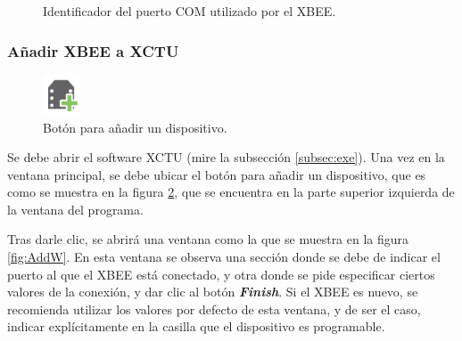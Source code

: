 \begin{figure}[H] %
\caption{Identificador del puerto COM utilizado por el XBEE.}
\label{fig:IdCom}
\end{figure}

\subsubsection{Añadir XBEE a XCTU}

\begin{figure} %
    \centering
    \includegraphics[width=0.10\textwidth]{Figures/XCTU/AddDeviceButton}
    \caption{Botón para añadir un dispositivo.}
    \label{fig:AddDevice}
\end{figure}

Se debe abrir el software XCTU (mire la subsección \ref{subsec:exe}). Una vez en la ventana principal, se debe ubicar el botón para añadir un dispositivo, que es como se muestra en la figura \ref{fig:AddDevice}, que se encuentra en la parte superior izquierda de la ventana del programa.

Tras darle clic, se abrirá una ventana como la que se muestra en la figura \ref{fig:AddW}. En esta ventana se observa una sección donde se debe de indicar el puerto al que el XBEE está conectado, y otra donde se pide especificar ciertos valores de la conexión, y dar clic al botón \textit{\textbf{Finish}}. Si el XBEE es nuevo, se recomienda utilizar los valores por defecto de esta ventana, y de ser el caso, indicar explícitamente en la casilla que el dispositivo es programable.

